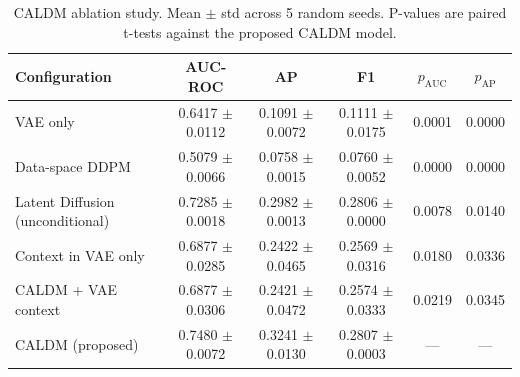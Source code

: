 \begin{table}[h]
\centering
\caption{CALDM ablation study. Mean $\pm$ std across 5 random seeds. P-values are paired t-tests against the proposed CALDM model.}
\label{tab:ablation}
\begin{tabular}{lccccc}
\toprule
Configuration & AUC-ROC & AP & F1 & $p_{\text{AUC}}$ & $p_{\text{AP}}$ \\
\midrule
VAE only & 0.6417 $\pm$ 0.0112 & 0.1091 $\pm$ 0.0072 & 0.1111 $\pm$ 0.0175 & 0.0001 & 0.0000 \\
Data-space DDPM & 0.5079 $\pm$ 0.0066 & 0.0758 $\pm$ 0.0015 & 0.0760 $\pm$ 0.0052 & 0.0000 & 0.0000 \\
Latent Diffusion (unconditional) & 0.7285 $\pm$ 0.0018 & 0.2982 $\pm$ 0.0013 & 0.2806 $\pm$ 0.0000 & 0.0078 & 0.0140 \\
Context in VAE only & 0.6877 $\pm$ 0.0285 & 0.2422 $\pm$ 0.0465 & 0.2569 $\pm$ 0.0316 & 0.0180 & 0.0336 \\
CALDM + VAE context & 0.6877 $\pm$ 0.0306 & 0.2421 $\pm$ 0.0472 & 0.2574 $\pm$ 0.0333 & 0.0219 & 0.0345 \\
CALDM (proposed) & 0.7480 $\pm$ 0.0072 & 0.3241 $\pm$ 0.0130 & 0.2807 $\pm$ 0.0003 & --- & --- \\
\bottomrule
\end{tabular}
\end{table}